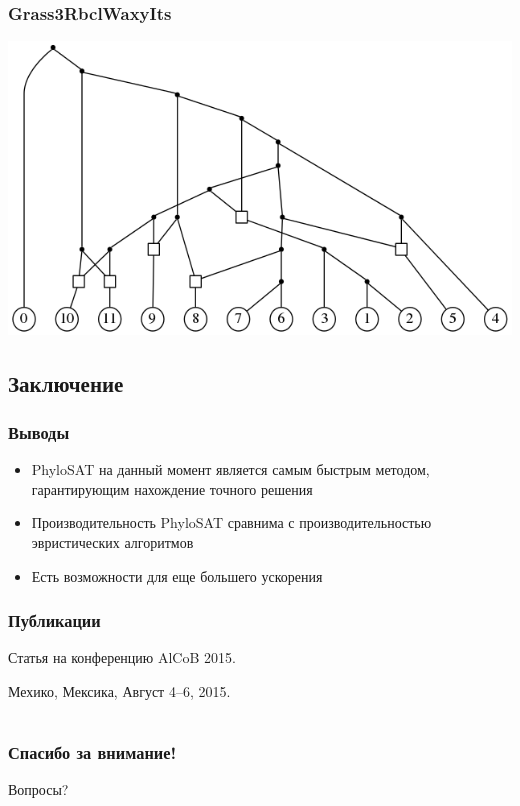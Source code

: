 \documentclass[hyperref={unicode}]{beamer}
\begin{document}
\begin{frame}
\frametitle{Grass3RbclWaxyIts}

\includegraphics[width=\linewidth]{img/Grass3RbclWaxyIts}
	
\end{frame}

\subsection{Заключение}

\begin{frame}
\frametitle{Выводы}

\begin{itemize}
	\item PhyloSAT на данный момент является самым быстрым методом, гарантирующим нахождение точного решения
	\item Производительность PhyloSAT сравнима с производительностью эвристических алгоритмов
	\item Есть возможности для еще большего ускорения
\end{itemize}

\end{frame}

\begin{frame}
\frametitle{Публикации}

Статья на конференцию AlCoB 2015.

Мехико, Мексика, Август 4--6, 2015.

\end{frame}

\section{}

\begin{frame}
\frametitle{Спасибо за внимание!}

Вопросы?
\end{frame}
\end{document}
